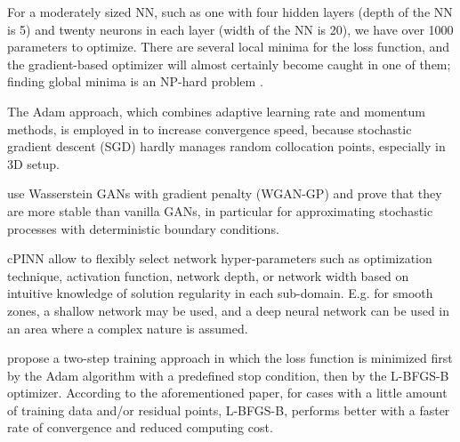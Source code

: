 \documentclass[pdflatex,sn-basic]{sn-jnl}%
\theoremstyle{thmstyleone}%
\theoremstyle{thmstyletwo}%
\theoremstyle{thmstylethree}%
\begin{document}
For a moderately sized NN, such as one with four hidden layers (depth of the NN is 5) and twenty neurons in each layer (width of the NN is 20), we have over 1000 parameters to optimize.
There are several local minima for the loss function, and the gradient-based optimizer will almost certainly become caught in one of them; finding global minima is an NP-hard problem \citep{Pan2019_FpinnsFractionalPhysics_LuPLK}.

The Adam approach, which combines adaptive learning rate and momentum methods, is employed in \cite{Zhu2021_MachineLearningMetal_LiuZLY} to increase convergence speed, because stochastic gradient descent (SGD) hardly manages random collocation points, especially in 3D setup.

\cite{Yan2020_PhysicsInformedGenerative_ZhaYZK} use Wasserstein GANs with gradient penalty (WGAN-GP) and prove that they are more stable than vanilla GANs, in particular for approximating stochastic processes with deterministic boundary conditions.

cPINN \citep{Jag2020_ConservativePhysicsInformed_KhaJKK} allow to flexibly select network hyper-parameters such as optimization technique, activation function, network depth, or network width based on intuitive knowledge of solution regularity in each sub-domain.
E.g. for smooth zones, a shallow network may be used, and a deep neural network can be used in an area where a complex nature is assumed.


\cite{He2020_PhysicsInformedNeural_BarHBTT}  propose a two-step training approach in which the loss function is minimized first by the Adam algorithm with a predefined stop condition, then by the L-BFGS-B optimizer.
%
According to the aforementioned paper, for cases with a little amount of training data and/or residual points, L-BFGS-B, performs better with a faster rate of convergence and reduced computing cost. 

\end{document}
